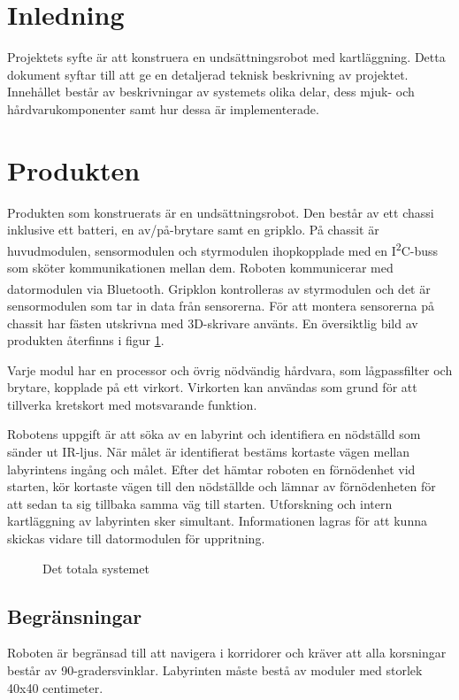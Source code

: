 \documentclass[11pt]{article}
\begin{document}
\begin{flushleft}
\section{Inledning}

Projektets syfte är att konstruera en undsättningsrobot med kartläggning. Detta dokument syftar till att ge en detaljerad teknisk beskrivning av projektet. Innehållet består av beskrivningar av systemets olika delar, dess mjuk- och hårdvarukomponenter samt hur dessa är implementerade.

\section{Produkten}
Produkten som konstruerats är en undsättningsrobot. Den består av ett chassi inklusive ett batteri, en av/på-brytare samt en gripklo. På chassit är huvudmodulen, sensormodulen och styrmodulen ihopkopplade med en I\textsuperscript{2}C-buss som sköter kommunikationen mellan dem. Roboten kommunicerar med datormodulen via Bluetooth\textsuperscript{\circledR}. Gripklon kontrolleras av styrmodulen och  det är sensormodulen som tar in data från sensorerna. För att montera sensorerna på chassit har fästen utskrivna med 3D-skrivare använts. En översiktlig bild av produkten återfinns i figur \ref{overview}.

Varje modul har en processor och övrig nödvändig hårdvara, som lågpassfilter och brytare, kopplade på ett virkort. Virkorten kan användas som grund för att tillverka kretskort med motsvarande funktion. 

Robotens uppgift är att söka av en labyrint och identifiera en nödställd som sänder ut IR-ljus. När målet är identifierat bestäms kortaste vägen mellan labyrintens ingång och målet. Efter det hämtar roboten en förnödenhet vid starten, kör kortaste vägen till den nödställde och lämnar av förnödenheten för att sedan ta sig tillbaka samma väg till starten. Utforskning och intern kartläggning av labyrinten sker simultant. Informationen lagras för att kunna skickas vidare till datormodulen för uppritning. 


\begin{figure}[!htbp]
\centering
\noindent\resizebox{\linewidth}{!}{
	}
	\caption{Det totala systemet \label{overview}}	
\end{figure}

\subsection{Begränsningar}
Roboten är begränsad till att navigera i korridorer och kräver att alla korsningar består av 90-gradersvinklar. Labyrinten måste bestå av moduler med storlek 40x40 centimeter.


\end{flushleft}
\end{document}
